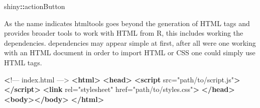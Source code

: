 \documentclass[
]{krantz}
\makeatletter
\newenvironment{Shaded}{\begin{snugshade}}{\end{snugshade}}
\newcommand{\ControlFlowTok}[1]{\textcolor[rgb]{0.27,0.27,0.27}{\textbf{#1}}}
\newcommand{\DataTypeTok}[1]{\textcolor[rgb]{0.27,0.27,0.27}{#1}}
\newcommand{\ErrorTok}[1]{\textcolor[rgb]{0.14,0.14,0.14}{\textbf{#1}}}
\newcommand{\KeywordTok}[1]{\textcolor[rgb]{0.27,0.27,0.27}{\textbf{#1}}}
\newcommand{\NormalTok}[1]{#1}
\newcommand{\OperatorTok}[1]{\textcolor[rgb]{0.43,0.43,0.43}{\textbf{#1}}}
\newcommand{\OtherTok}[1]{\textcolor[rgb]{0.37,0.37,0.37}{#1}}
\newcommand{\StringTok}[1]{\textcolor[rgb]{0.5,0.5,0.5}{#1}}
\newenvironment{kframe}{%
\medskip{}
\setlength{\fboxsep}{.8em}
 \def\at@end@of@kframe{}%
 \ifinner\ifhmode%
  \def\at@end@of@kframe{\end{minipage}}%
  \begin{minipage}{\columnwidth}%
 \fi\fi%
 \def\FrameCommand##1{\hskip\@totalleftmargin \hskip-\fboxsep
 \colorbox{shadecolor}{##1}\hskip-\fboxsep
     \hskip-\linewidth \hskip-\@totalleftmargin \hskip\columnwidth}%
 \MakeFramed {\advance\hsize-\width
   \@totalleftmargin\z@ \linewidth\hsize
   \@setminipage}}%
 {\par\unskip\endMakeFramed%
 \at@end@of@kframe}
\renewenvironment{Shaded}{\begin{kframe}}{\end{kframe}}
\makeatother
\begin{document}
\begin{Shaded}
\begin{Highlighting}[]
\NormalTok{shiny}\OperatorTok{::}\NormalTok{actionButton}
\end{Highlighting}
\end{Shaded}

\begin{Shaded}
\end{Shaded}

As the name indicates htmltools goes beyond the generation of HTML tags and provides broader tools to work with HTML from R, this includes working the dependencies. dependencies may appear simple at first, after all were one working with an HTML document in order to import HTML or CSS one could simply use HTML tags.

\begin{Shaded}
\begin{Highlighting}[]
 \ErrorTok{\textless{}}\NormalTok{!–– index.html ––\textgreater{}}
\KeywordTok{\textless{}html\textgreater{}}
  \KeywordTok{\textless{}head\textgreater{}}
    \KeywordTok{\textless{}script}\OtherTok{ src=}\StringTok{"path/to/script.js"}\KeywordTok{\textgreater{}\textless{}/script\textgreater{}}
    \KeywordTok{\textless{}link}\OtherTok{ rel=}\StringTok{"stylesheet"}\OtherTok{ href=}\StringTok{"path/to/styles.css"}\KeywordTok{\textgreater{}}
  \KeywordTok{\textless{}/head\textgreater{}}
  \KeywordTok{\textless{}body\textgreater{}\textless{}/body\textgreater{}}
\KeywordTok{\textless{}/html\textgreater{}}
\end{Highlighting}
\end{Shaded}
\end{document}
